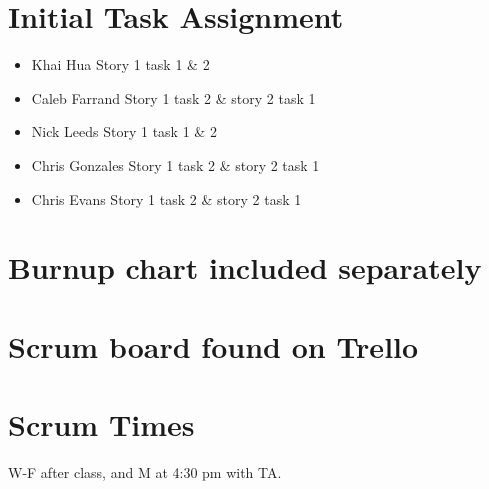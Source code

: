 \documentclass[11pt]{article}
\begin{document}
	\section{Initial Task Assignment}
	    \vspace{-3mm}
	    \begin{itemize}
		    \item Khai Hua Story 1 task 1 \& 2
		    \item Caleb Farrand Story 1 task 2 \& story 2 task 1
		    \item Nick Leeds Story 1 task 1 \& 2
		    \item Chris Gonzales Story 1 task 2 \& story 2 task 1
		    \item Chris Evans Story 1 task 2 \& story 2 task 1
		\end{itemize}
	\section{Burnup chart included separately}
	\section{Scrum board found on Trello}
	\section{Scrum Times}
	    W-F after class, and M at 4:30 pm with TA.
\end{document}
